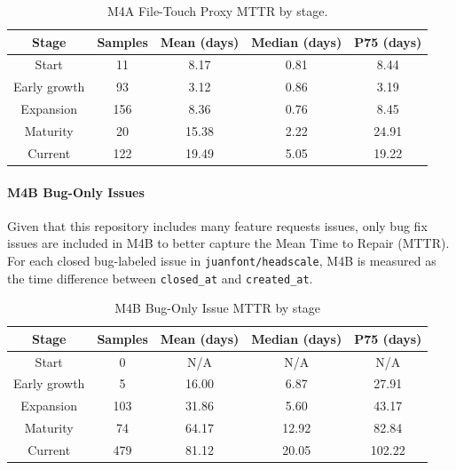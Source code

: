 \documentclass[11pt, a4paper]{article}
\begin{document}
\begin{table}[H]
\centering
\small
\begin{tabularx}{\textwidth}{|C|C|C|C|C|}
    \hline
    \textbf{Stage} & \textbf{Samples} & \textbf{Mean (days)} & \textbf{Median (days)} & \textbf{P75 (days)} \\
    \hline
    Start & 11 & 8.17 & 0.81 & 8.44 \\
    \hline
    Early growth & 93 & 3.12 & 0.86 & 3.19 \\
    \hline
    Expansion & 156 & 8.36 & 0.76 & 8.45 \\
    \hline
    Maturity & 20 & 15.38 & 2.22 & 24.91 \\
    \hline
    Current & 122 & 19.49 & 5.05 & 19.22 \\
    \hline
\end{tabularx}
\caption{M4A File-Touch Proxy MTTR by stage.}
\label{tab:m4a_mttr_file_touch}
\end{table}

\paragraph{M4B Bug-Only Issues}
Given that this repository includes many feature requests issues, only bug fix issues are included in M4B to better capture the Mean Time to Repair (MTTR). For each closed bug-labeled issue in \texttt{juanfont/headscale}, M4B is measured as the time difference between \texttt{closed\_at} and \texttt{created\_at}.

\begin{table}[H]
\centering
\small
\begin{tabularx}{\textwidth}{|C|C|C|C|C|}
    \hline
    \textbf{Stage} & \textbf{Samples} & \textbf{Mean (days)} & \textbf{Median (days)} & \textbf{P75 (days)} \\
    \hline
    Start  & 0 & N/A & N/A & N/A \\
    \hline
    Early growth & 5 & 16.00 & 6.87 & 27.91 \\
    \hline
    Expansion & 103 & 31.86 & 5.60 & 43.17 \\
    \hline
    Maturity & 74 & 64.17 & 12.92 & 82.84 \\
    \hline
    Current & 479 & 81.12 & 20.05 & 102.22 \\
    \hline
\end{tabularx}
\caption{M4B Bug-Only Issue MTTR by stage}
\label{tab:m4b_mttr_bug_issues}
\end{table}
\end{document}
